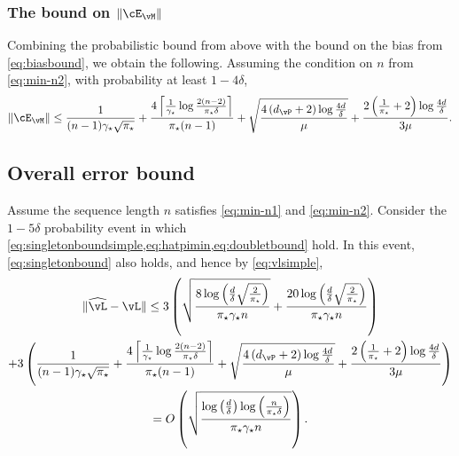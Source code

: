 \subsubsection{The bound on $\norm{\errm}$}
Combining the probabilistic bound from above with the bound on the
bias from \cref{eq:biasbound}, we obtain the following.
Assuming the condition on $n$ from \cref{eq:min-n2}, with probability
at least $1-4\delta$,
\begin{equation}
  \norm{\errm}
  \leq
  \frac{1}{(n-1)\gap\sqrt{\pimin}}
  +
  \frac{4
    \Ceil{
      \frac{1}{\gap}\log\frac{2(n-2)}{\pimin\delta}
    }
  }{\pimin(n-1)}
  +
  \sqrt{
    \frac{4\Parens{ d_{\vP} + 2 } \log\frac{4d}{\delta}}
    {\mu}
  }
  + \frac{2\Parens{ \frac1{\pimin} + 2 } \log\frac{4d}{\delta}}
  {3\mu}
  .
  \label{eq:doubletbound}
\end{equation}

\subsection{Overall error bound}
Assume the sequence length $n$ satisfies \cref{eq:min-n1} and
\cref{eq:min-n2}.
Consider the $1-5\delta$ probability event in which
\cref{eq:singletonboundsimple,eq:hatpimin,eq:doubletbound} hold.
In this event, \cref{eq:singletonbound} also holds, and hence by
\cref{eq:vlsimple},
\begin{multline*}
  \norm{\wh\vL - \vL}
  \leq
  3
  \Parens{
    \sqrt{
      \frac{
        8\log\Parens{\frac{d}\delta\sqrt{\frac{2}{\pimin}}}
      }{
        \pimin\gap n
      }
    }
    +
    \frac{
      20\log\Parens{\frac{d}\delta\sqrt{\frac{2}{\pimin}}}
    }{
      \pimin\gap n
    }
  }
  \\
  +
  3\Parens{
    \frac{1}{(n-1)\gap\sqrt{\pimin}}
    +
    \frac{4
      \Ceil{
        \frac{1}{\gap}\log\frac{2(n-2)}{\pimin\delta}
      }
    }{\pimin(n-1)}
    +
    \sqrt{
      \frac{4\Parens{ d_{\vP} + 2 } \log\frac{4d}{\delta}}
      {\mu}
    }
    + \frac{2\Parens{ \frac1{\pimin} + 2 } \log\frac{4d}{\delta}}
    {3\mu}
  }
  \\
  =
  O
  \Parens{
    \sqrt{
      \frac{
        \log\Parens{\frac{d}{\delta}}
        \log\Parens{\frac{n}{\pimin\delta}}
      }{\pimin\gap n}
    }
  }
  .
\end{multline*}


